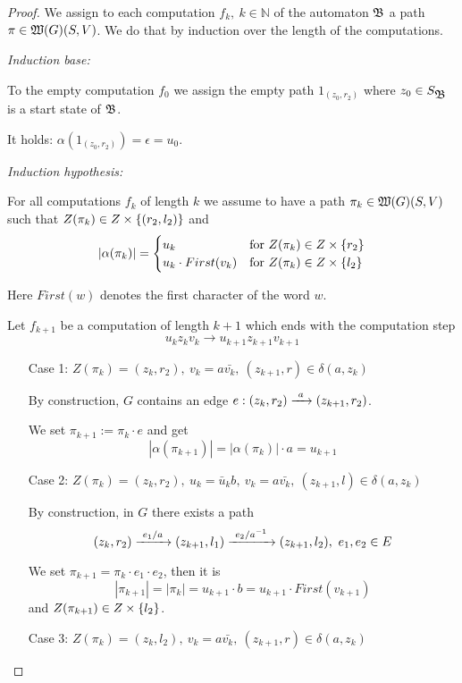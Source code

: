 \begin{proof}
We assign to each computation $f_k,\ k \in \mathbb{N}$ of the automaton $\mbox{$\mathfrak{B}$}$
a path $\pi \in \mbox{$\mathfrak{W}({G})$}(S, V)$. We do that by induction over the length of
the computations.

{\em Induction base:}

To the empty computation $f_0$ we assign the empty path $1_{(z_0, r_2)}$ where
$z_0 \in S_{\mbox{$\mathfrak{B}$}}$ is a start state of $\mbox{$\mathfrak{B}$}$.

It holds: $\alpha(1_{(z_0, r_2)}) = \epsilon = u_0$.

{\em Induction hypothesis:}

For all computations $f_k$ of length $k$ we assume to have a path $\pi_k \in
\mbox{$\mathfrak{W}({G})$}(S, V)$ such that $Z(\pi_k) \in Z \times \mbox{$\{(r_2, l_2)\}$}$ and
\[ |\alpha(\pi_k)| = \begin{cases}
u_k & \text{for }Z(\pi_k) \in Z \times \mbox{$\{r_2\}$} \\
u_k \cdot First(v_k) & \text{for }Z(\pi_k) \in Z \times \mbox{$\{l_2\}$}
\end{cases} \]

Here $First(w)$ denotes the first character of the word $w$.

Let $f_{k+1}$ be a computation of length $k+1$ which ends with the computation
step
\[ u_k z_k v_k \to u_{k+1} z_{k+1} v_{k+1} \]

\begin{itemize}
  \item[Case 1:] $Z(\pi_k) = (z_k, r_2),\ v_k = a \bar{v_k},\ (z_{k+1}, r) \in
  \delta(a, z_k)$
  
  By construction, $G$ contains an edge $e: (z_k, r_2) \xrightarrow{\ {a}\ } (z_{k+1}, r_2)$.
  
  We set $\pi_{k+1} := \pi_k \cdot e$ and get
  \[ |\alpha(\pi_{k+1})| = |\alpha(\pi_k)| \cdot a = u_{k+1} \]
  
  \item[Case 2:] $Z(\pi_k) = (z_k, r_2),\ u_k = \bar{u}_k b,\ v_k = a
  \bar{v_k},\ (z_{k+1}, l) \in \delta(a, z_k)$
  
  By construction, in $G$ there exists a path
  \[ (z_k, r_2) \xrightarrow{\ {e_1 / a}\ } (z_{k+1}, l_1) \xrightarrow{\ {e_2 / {{a}^{-1}}}\ } (z_{k+1},
  l_2),\ e_1, e_2 \in E \]
  
  We set $\pi_{k+1} = \pi_k \cdot e_1 \cdot e_2$, then it is
  \[ |\pi_{k+1}| = |\pi_k| = u_{k+1} \cdot b = u_{k+1} \cdot First(v_{k+1}) \]
  and $Z(\pi_{k+1}) \in Z \times \mbox{$\{l_2\}$}$.
  
  \item[Case 3:] $Z(\pi_k) = (z_k, l_2),\ v_k = a \bar{v_k},\ (z_{k+1}, r) \in
  \delta(a, z_k)$
  

\end{itemize}
\end{proof}
